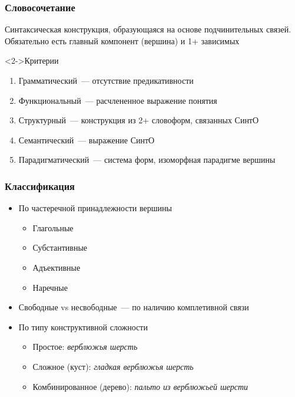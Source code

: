 \begin{frame}
  \frametitle{Словосочетание}

  Синтаксическая конструкция, образующаяся на основе подчинительных связей. Обязательно есть главный компонент (вершина) и 1+ зависимых

  \vfill

  \begin{block}<2->{Критерии}
    \begin{enumerate}
      \item Грамматический~--- отсутствие предикативности
      \item Функциональный~--- расчлененное выражение понятия
      \item Структурный~--- конструкция из 2+ словоформ, связанных СинтО
      \item Семантический~--- выражение СинтО
      \item Парадигматический~--- система форм, изоморфная парадигме вершины
    \end{enumerate}
  \end{block}

\end{frame}

\begin{frame}
  \frametitle{Классификация}

  \begin{itemize}
    \item По частеречной принадлежности вершины \begin{itemize}
      \item Глагольные
      \item Субстантивные
      \item Адъективные
      \item Наречные
    \end{itemize}
    \item Свободные vs несвободные~--- по наличию комплетивной связи
    \item По типу конструктивной сложности \begin{itemize}
      \item Простое: \textit{верблюжья шерсть}
      \item Сложное (куст): \textit{гладкая верблюжья шерсть}
      \item Комбинированное (дерево): \textit{пальто из верблюжьей шерсти}
    \end{itemize}
  \end{itemize}
\end{frame}

